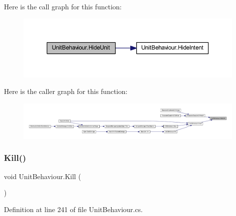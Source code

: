 Here is the call graph for this function\+:
\nopagebreak
\begin{figure}[H]
\begin{center}
\leavevmode
\includegraphics[width=350pt]{class_unit_behaviour_aaf48af005978a326a61c98905630e469_cgraph}
\end{center}
\end{figure}
Here is the caller graph for this function\+:
\nopagebreak
\begin{figure}[H]
\begin{center}
\leavevmode
\includegraphics[width=350pt]{class_unit_behaviour_aaf48af005978a326a61c98905630e469_icgraph}
\end{center}
\end{figure}
\mbox{\label{class_unit_behaviour_a9a32f3234ea6b89f686c6cd55d924348}} 
\subsubsection{\texorpdfstring{Kill()}{Kill()}}
{\footnotesize\ttfamily void Unit\+Behaviour.\+Kill (\begin{DoxyParamCaption}{ }\end{DoxyParamCaption})}



Definition at line 241 of file Unit\+Behaviour.\+cs.

